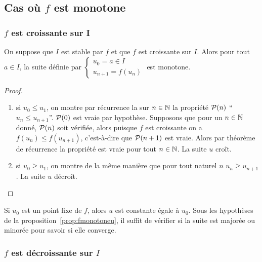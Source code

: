 \subsection{Cas où \(f\) est monotone}

\subsubsection{\(f\) est croissante sur I}

\begin{prop}\label{prop:fmonotoneu}
  On suppose que \(I\) est stable par \(f\) et que \(f\) est croissante sur 
  \(I\). Alors pour tout \(a \in I\), la suite définie par \(\begin{cases} u_0=a 
  \in I \\ u_{n+1}=f(u_n) \end{cases}\) est monotone.
\end{prop}
\begin{proof}
  \begin{enumerate}
    \item si \(u_0 \leqslant u_1\), on montre par récurrence la sur \(n \in \N\) 
      la propriété \(\P(n)\) ``\(u_n \leqslant u_{n+1}\)''. \(\P(0)\) est vraie 
      par hypothèse. Supposons que pour un \(n \in \N\) donné, \(\P(n)\) soit 
      vérifiée, alors puisque \(f\) est croissante on a \(f(u_n) \leqslant 
      f(u_{n+1})\), c'est-à-dire que \(\P(n+1)\) est vraie. Alors par théorème 
      de récurrence la propriété est vraie pour tout \(n \in \N\). La suite 
      \(u\) croît.
    \item si \(u_0 \geqslant u_1\), on montre de la même manière que pour tout 
      naturel \(n\) \(u_n \geqslant u_{n+1}\). La suite \(u\) décroît.
  \end{enumerate}
\end{proof}

Si \(u_0\) est un point fixe de \(f\), alors \(u\) est constante égale à 
\(u_0\). Sous les hypothèses de la proposition~\ref{prop:fmonotoneu},
il suffit de vérifier si la suite est majorée ou minorée pour savoir si elle
converge.

\subsubsection{\(f\) est décroissante sur \(I\)}

